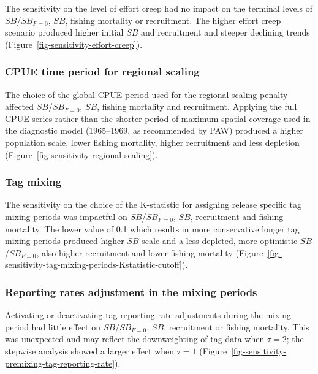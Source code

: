 \documentclass[
  english,
  a4paper,
  a4paper,
  11pt]{SCreport}
\begin{document}
The sensitivity on the level of effort creep had no impact on the
terminal levels of \(SB\)/\(SB_{F=0}\), \(SB\), fishing mortality or
recruitment. The higher effort creep scenario produced higher initial
\(SB\) and recruitment and steeper declining trends
(Figure~\ref{fig-sensitivity-effort-creep}).

\subsubsection{CPUE time period for regional
scaling}\label{sec-oneoff-regional-scaling}

The choice of the global-CPUE period used for the regional scaling
penalty affected \(SB\)/\(SB_{F=0}\), \(SB\), fishing mortality and
recruitment. Applying the full CPUE series rather than the shorter
period of maximum spatial coverage used in the diagnostic model
(1965--1969, as recommended by PAW) produced a higher population scale,
lower fishing mortality, higher recruitment and less depletion
(Figure~\ref{fig-sensitivity-regional-scaling}).

\subsubsection{Tag mixing}\label{sec-oneoff-tag-mixing}

The sensitivity on the choice of the K-statistic for assigning release
specific tag mixing periods was impactful on \(SB\)/\(SB_{F=0}\),
\(SB\), recruitment and fishing mortality. The lower value of 0.1 which
results in more conservative longer tag mixing periods produced higher
\(SB\) scale and a less depleted, more optimistic \(SB\)/\(SB_{F=0}\),
also higher recruitment and lower fishing mortality
(Figure~\ref{fig-sensitivity-tag-mixing-periods-Kstatistic-cutoff}).

\subsubsection{Reporting rates adjustment in the mixing
periods}\label{sec-oneoff-rr-during-mixing-period}

Activating or deactivating tag-reporting-rate adjustments during the
mixing period had little effect on \(SB\)/\(SB_{F=0}\), \(SB\),
recruitment or fishing mortality. This was unexpected and may reflect
the downweighting of tag data when \(\tau=2\); the stepwise analysis
showed a larger effect when \(\tau=1\)
(Figure~\ref{fig-sensitivity-premixing-tag-reporting-rate}).
\end{document}
